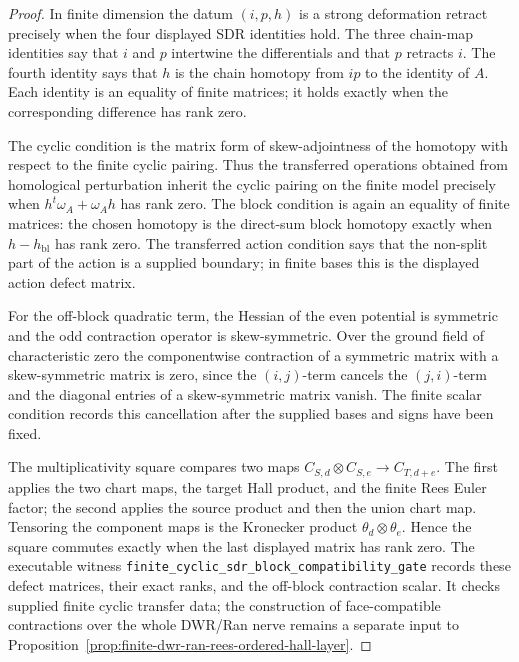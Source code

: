 \begin{proof}
In finite dimension the datum \((i,p,h)\) is a strong deformation
retract precisely when the four displayed SDR identities hold. The
three chain-map identities say that \(i\) and \(p\) intertwine the
differentials and that \(p\) retracts \(i\). The fourth identity says
that \(h\) is the chain homotopy from \(ip\) to the identity of \(A\).
Each identity is an equality of finite matrices; it holds exactly when
the corresponding difference has rank zero.

The cyclic condition is the matrix form of skew-adjointness of the
homotopy with respect to the finite cyclic pairing. Thus the transferred
operations obtained from homological perturbation inherit the cyclic
pairing on the finite model precisely when
\(h^{t}\omega_A+\omega_Ah\) has rank zero. The block condition is again
an equality of finite matrices: the chosen homotopy is the direct-sum
block homotopy exactly when \(h-h_{\mathrm{bl}}\) has rank zero. The
transferred action condition says that the non-split part of the action
is a supplied boundary; in finite bases this is the displayed action
defect matrix.

For the off-block quadratic term, the Hessian of the even potential is
symmetric and the odd contraction operator is skew-symmetric. Over the
ground field of characteristic zero the componentwise contraction of a
symmetric matrix with a skew-symmetric matrix is zero, since the
\((i,j)\)-term cancels the \((j,i)\)-term and the diagonal entries of a
skew-symmetric matrix vanish. The finite scalar condition records this
cancellation after the supplied bases and signs have been fixed.

The multiplicativity square compares two maps
\(C_{S,d}\otimes C_{S,e}\to C_{T,d+e}\). The first applies the two
chart maps, the target Hall product, and the finite Rees Euler factor;
the second applies the source product and then the union chart map.
Tensoring the component maps is the Kronecker product
\(\theta_d\otimes\theta_e\). Hence the square commutes exactly when the
last displayed matrix has rank zero. The executable witness
\texttt{finite\_cyclic\_sdr\_block\_compatibility\_gate} records these
defect matrices, their exact ranks, and the off-block contraction
scalar. It checks supplied finite cyclic transfer data; the construction
of face-compatible contractions over the whole DWR/Ran nerve remains a
separate input to Proposition~\ref{prop:finite-dwr-ran-rees-ordered-hall-layer}.
\end{proof}

